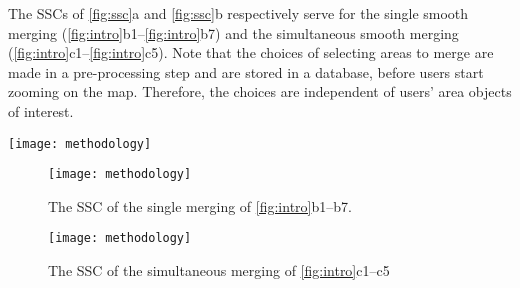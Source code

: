 \documentclass[twocolumn]{svjour3}          %
\begin{document}
The SSCs of \fig\ref{fig:ssc}a and \fig\ref{fig:ssc}b respectively 
serve for the single smooth merging 
(\figs\ref{fig:intro}b1--\ref{fig:intro}b7) 
and the simultaneous smooth merging 
(\figs\ref{fig:intro}c1--\ref{fig:intro}c5).
Note that the choices of selecting areas to merge 
are made in a pre-processing step and are stored in a database, 
before users start zooming on the map.
Therefore, the choices are independent of users' area objects of interest.






\begin{figure*}[tb]
\centering
\texttt{[image: methodology]}
\caption{A comparison of different scale-transition strategies.
Each arrow inside the subfigures indicates a merging operation.
The arrow in the right-hand side indicates the states of zooming out.
%
Subfigures (a1--a3), (b1--b7), and (c1--c5) represent the states
at which the zooming may stop.
Subfigures~(a4), (b8), (c6), and (c7) 
are the map representations during the scale transition,
where their corresponding states are indicated by the gray dots.
The numbers are the IDs of the areas. 
Note that the colors of the smaller areas
adapt to the colors of the larger areas during merging.
}
\label{fig:intro}
\end{figure*}

\begin{figure*}
\centering
\begin{subfigure}[t]{0.48\textwidth}
\centering
\texttt{[image: methodology]}
\caption{The SSC of the single merging of \figs\ref{fig:intro}b1--b7.}
\end{subfigure}
\hfill
\begin{subfigure}[t]{0.48\textwidth}
\centering
\texttt{[image: methodology]}
\caption{The SSC of the simultaneous merging of \figs\ref{fig:intro}c1--c5}
\end{subfigure}
\caption{
In the left SSC, only one merging event is happening 
at a specific state ($z$-dimension), 
while in the right SSC multiple merging events may happen at the same state.
}
\label{fig:ssc}
\end{figure*}
\end{document}
